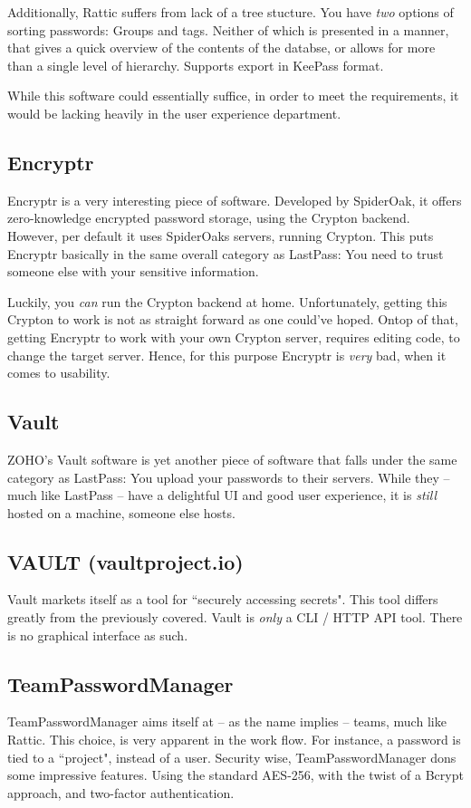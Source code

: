 			Additionally, Rattic suffers from lack of a tree stucture. You have \emph{two} options of sorting passwords: Groups and tags. Neither of which is presented in a manner, that gives a quick overview of the contents of the databse, or allows for more than a single level of hierarchy. Supports export in KeePass format.
			
			While this software could essentially suffice, in order to meet the requirements, it would be lacking heavily in the user experience department.


		\subsection{Encryptr}
			Encryptr is a very interesting piece of software. Developed by SpiderOak, it offers zero-knowledge encrypted password storage, using the Crypton backend. However, per default it uses SpiderOaks servers, running Crypton. This puts Encryptr basically in the same overall category as LastPass: You need to trust someone else with your sensitive information. 

			Luckily, you \emph{can} run the Crypton backend at home. Unfortunately, getting this Crypton to work is not as straight forward as one could've hoped. Ontop of that, getting Encryptr to work with your own Crypton server, requires editing code, to change the target server. Hence, for this purpose Encryptr is \emph{very} bad, when it comes to usability.

		\subsection{Vault}
			ZOHO's Vault software is yet another piece of software that falls under the same category as LastPass: You upload your passwords to their servers. While they -- much like LastPass -- have a delightful UI and good user experience, it is \emph{still} hosted on a machine, someone else hosts.

			
		\subsection{VAULT (vaultproject.io)}
			Vault markets itself as a tool for ``securely accessing secrets". This tool differs greatly from the previously covered. Vault is \emph{only} a CLI / HTTP API tool. There is no graphical interface as such.

		\subsection{TeamPasswordManager}
			TeamPasswordManager aims itself at -- as the name implies -- teams, much like Rattic. This choice, is very apparent in the work flow. For instance, a password is tied to a ``project", instead of a user. Security wise, TeamPasswordManager dons some impressive features. Using the standard AES-256, with the twist of a Bcrypt approach, and two-factor authentication.

